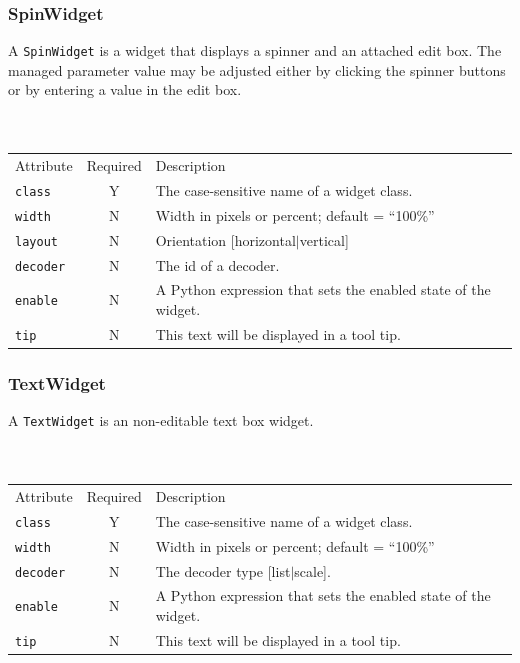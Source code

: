 \documentclass[a4paper,twoside,12pt]{article}
\newcommand{\code}[1]{\color{red}\texttt{#1}\color{black}}
\begin{document}
\subsubsection{SpinWidget}
A \code{SpinWidget}{} is a widget that displays a spinner and an
attached edit box. The managed parameter value may be adjusted
either by clicking the spinner buttons or by entering a value in
the edit box.
\\
\\
\\
\begin{tabular}{|l|c|p{9cm}|}
\hline
Attribute & Required & Description \\
\code{class} & Y & The case-sensitive name of a widget class. \\
\code{width} & N & Width in pixels or percent; default = ``100\%'' \\
\code{layout} & N & Orientation [horizontal$|$vertical] \\
\code{decoder} & N & The id of a decoder. \\
\code{enable} & N & A Python expression that sets the
enabled state of the widget. \\
\code{tip} & N & This text will be displayed in a tool tip. \\
\hline
\end{tabular}

\subsubsection{TextWidget}
A \code{TextWidget}{} is an non-editable text box widget.
\\
\\
\\
\begin{tabular}{|l|c|p{9cm}|}
\hline
Attribute & Required & Description \\
\code{class} & Y & The case-sensitive name of a widget class. \\
\code{width} & N & Width in pixels or percent; default = ``100\%'' \\
\code{decoder} & N & The decoder type [list$|$scale]. \\
\code{enable} & N & A Python expression that sets the enabled
state of the widget. \\
\code{tip} & N & This text will be displayed in a tool tip. \\
\hline
\end{tabular}
\end{document}
